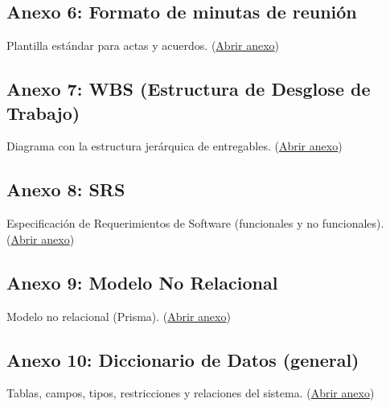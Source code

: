 \subsection*{Anexo 6: Formato de minutas de reunión}
\label{anexo:formato_minutas}
\parbox{\linewidth}{%
Plantilla estándar para actas y acuerdos.
(\href{https://drive.google.com/drive/folders/1BHOoTcfT2bxG1wUy7kJ4X7yb6q9h27er?usp=sharing}{Abrir anexo})
}

\subsection*{Anexo 7: WBS (Estructura de Desglose de Trabajo)}
\label{anexo:wbs}
\parbox{\linewidth}{%
Diagrama con la estructura jerárquica de entregables.
(\href{https://drive.google.com/drive/folders/1ttuiMCmFBvJN9ji7XTXY-opBWwPszsYA?usp=sharing}{Abrir anexo})
}

\subsection*{Anexo 8: SRS}
\label{anexo:documento_srs}
\parbox{\linewidth}{%
Especificación de Requerimientos de Software (funcionales y no funcionales).
(\href{https://drive.google.com/file/d/1oJmhAV7PfzoFyCYmLh3L8nMICLeYXLhq/view?usp=sharing}{Abrir anexo})
}

\subsection*{Anexo 9: Modelo No Relacional}
\label{anexo:modelo_no_relacional}
\parbox{\linewidth}{%
Modelo no relacional (Prisma).
(\href{https://drive.google.com/file/d/1ib_2B1VA6txi9h-J2I136l8i4TbnE690/view?usp=sharing}{Abrir anexo})
}

\subsection*{Anexo 10: Diccionario de Datos (general)}
\label{anexo:diccionario_general}
\parbox{\linewidth}{%
Tablas, campos, tipos, restricciones y relaciones del sistema.
(\href{https://drive.google.com/file/d/1sHDwVC5bjJg16aMmE7ue0gawE14cJS49/view?usp=sharing}{Abrir anexo})
}

